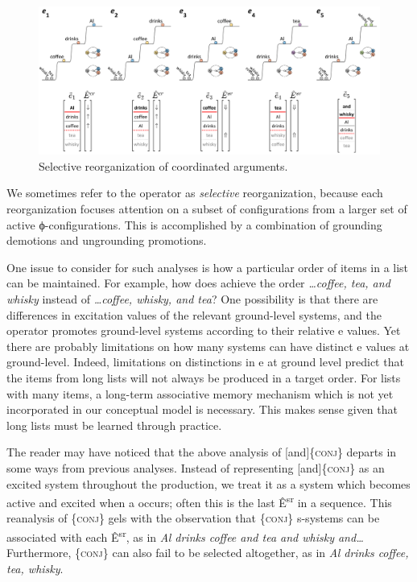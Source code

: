   
\begin{figure}
\includegraphics[width=\textwidth]{figures/Tilsen-img99.png}
\caption{Selective reorganization of coordinated arguments.}
\label{fig:4:49}
\end{figure}
   

  We sometimes refer to the  operator as \textit{ selective} reorganization, because each reorganization focuses attention on a subset of configurations from a larger set of active ϕ-configurations. This is accomplished by a combination of grounding demotions and ungrounding promotions.

  One issue to consider for such analyses is how a particular order of items in a list can be maintained. For example, how does  achieve the order \textit{…coffee, tea, and whisky} instead of \textit{…coffee, whisky, and tea}? One possibility is that there are differences in excitation values of the relevant ground-level systems, and the  operator promotes ground-level systems according to their relative e values. Yet there are probably limitations on how many systems can have distinct e values at ground-level. Indeed, limitations on distinctions in e at ground level predict that the items from long lists will not always be produced in a target order. For lists with many items, a long-term associative memory mechanism which is not yet incorporated in our conceptual model is necessary. This makes sense given that long lists must be learned through practice.

  The reader may have noticed that the above analysis of [and]\{\textsc{conj}\} departs in some ways from previous analyses. Instead of representing [and]\{\textsc{conj}\} as an excited system throughout the production, we treat it as a system which becomes active and excited when a  occurs; often this is the last Ê\textsuperscript{sr} in a sequence. This reanalysis of \{\textsc{conj}\} gels with the observation that \{\textsc{conj}\} s-systems can be associated with each Ê\textsuperscript{sr}, as in \textit{Al drinks coffee and tea and whisky and…} Furthermore, \{\textsc{conj}\} can also fail to be selected altogether, as in \textit{Al drinks coffee, tea, whisky}.

